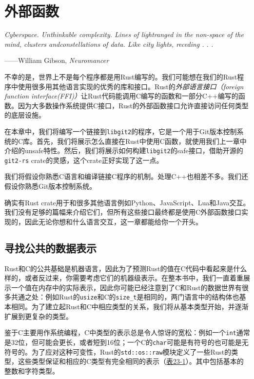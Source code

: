 \chapter{外部函数}\label{ch23}
\emph{Cyberspace. Unthinkable complexity. Lines of lightranged in the non-space of the mind, clusters andconstellations of data. Like city lights, receding . . .}

\begin{flushright}
    ——William Gibson, \emph{Neuromancer}
\end{flushright}

不幸的是，世界上不是每个程序都是用Rust编写的。我们可能想在我们的Rust程序中使用很多用其他语言实现的优秀的库和接口。Rust的\emph{外部语言接口（foreign function interface(FFI)）}让Rust代码能调用C编写的函数和一部分C++编写的函数。因为大多数操作系统提供C接口，Rust的外部函数接口允许直接访问任何类型的底层设施。

在本章中，我们将编写一个链接到\texttt{libgit2}的程序，它是一个用于Git版本控制系统的C库。首先，我们将展示怎么直接在Rust中使用C函数，就使用我们上一章中介绍的unsafe特性。然后，我们将展示如何构建\texttt{libgit2}的safe接口，借助开源的\texttt{git2-rs} crate的灵感，这个crate正好实现了这一点。

我们将假设你熟悉C语言和编译链接C程序的机制。处理C++也相差不多。我们还假设你熟悉Git版本控制系统。

确实有Rust crate用于和很多其他语言例如Python、JavaScript、Lua和Java交互。我们没有足够的篇幅来介绍它们，但所有这些接口最终都是使用C外部函数接口实现的，因此无论你想和什么语言交互，这一章都能给你一个开头。

\section{寻找公共的数据表示}\label{repr}
Rust和C的公共基础是机器语言，因此为了预测Rust的值在C代码中看起来是什么样的，或者反过来，你需要考虑它们的机器级表示。在整本书中，我们一直着重展示一个值在内存中的实际表示，因此你可能已经注意到了C和Rust的数据世界有很多共通之处：例如Rust的\texttt{usize}和C的\texttt{size\_t}是相同的，两门语言中的结构体也基本相同。为了建立起Rust和C中相应类型的关系，我们将从基本类型开始，并逐渐扩展到更复杂的类型。

鉴于C主要用作系统编程，C中类型的表示总是令人惊讶的宽松：例如一个\texttt{int}通常是32位，但可能会更长，或者短到16位；一个C的\texttt{char}可能是有符号的也可能是无符号的。为了应对这种可变性，Rust的\texttt{std::os::raw}模块定义了一些Rust的类型，这些类型保证和相应的C类型有完全相同的表示（\hyperref[t23-1]{表23-1}）。其中包括基本的整数和字符类型。

